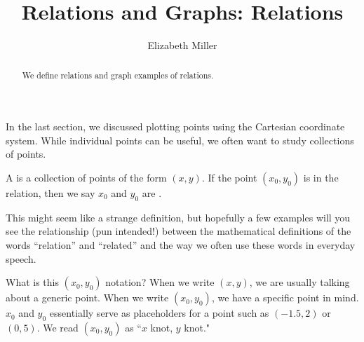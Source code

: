 \documentclass{ximera}
\author{Elizabeth Miller}
\title{Relations and Graphs: Relations}
\begin{document}
\begin{abstract}
We define relations and graph examples of relations. 
\end{abstract}
\maketitle



In the last section, we discussed plotting points using the Cartesian coordinate system. While individual points can be useful, we often want to study collections of points.


\begin{definition}
A  is a collection of points of the form $(x,y)$.  If the point $(x_0,y_0)$ is in the relation, then we say $x_0$ and $y_0$ are .
\end{definition}

This might seem like a strange definition, but hopefully a few
examples will you see the relationship (pun intended!) between the
mathematical definitions of the words ``relation'' and ``related'' and the
way we often use these words in everyday speech.

\begin{MM}
What is this $(x_0,y_0)$ notation?  When we write $(x,y)$, we are usually talking about a generic point.  When we write $(x_0,y_0)$, we have a specific point in mind.  $x_0$ and $y_0$ essentially serve as placeholders for a point such as $(-1.5, 2)$ or $(0,5)$. We read $(x_0,y_0)$ as ``$x$ knot, $y$ knot."
\end{MM}
\end{document}
